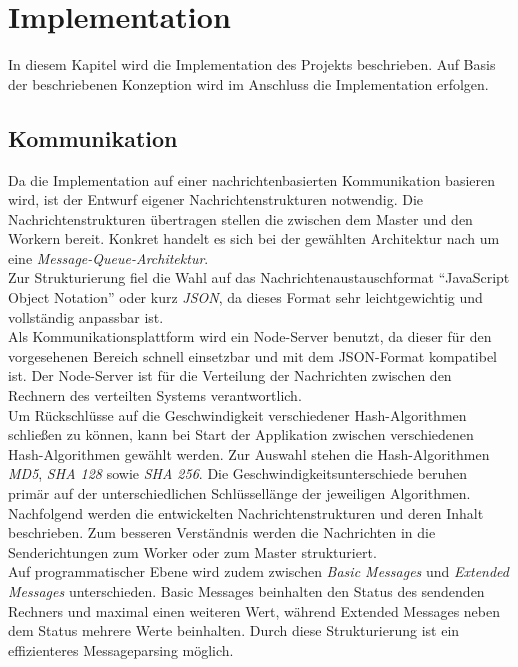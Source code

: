 \chapter{Implementation}
\label{implementation}
In diesem Kapitel wird die Implementation des Projekts beschrieben. Auf Basis der beschriebenen Konzeption wird im Anschluss die Implementation erfolgen. 
\section{Kommunikation}
Da die Implementation auf einer nachrichtenbasierten Kommunikation basieren wird, ist der Entwurf eigener Nachrichtenstrukturen notwendig. Die Nachrichtenstrukturen übertragen stellen die zwischen dem Master und den Workern bereit. Konkret handelt es sich bei der gewählten Architektur nach \citep{tanenbaum} um eine \emph{Message-Queue-Architektur}. \\
Zur Strukturierung fiel die Wahl auf das Nachrichtenaustauschformat \enquote{JavaScript Object Notation} oder kurz \emph{JSON}, da dieses Format sehr leichtgewichtig und vollständig anpassbar ist. \\
Als Kommunikationsplattform wird ein Node-Server benutzt, da dieser für den vorgesehenen Bereich schnell einsetzbar und mit dem JSON-Format kompatibel ist. Der Node-Server ist für die Verteilung der Nachrichten zwischen den Rechnern des verteilten Systems verantwortlich. \\

Um Rückschlüsse auf die Geschwindigkeit verschiedener Hash-Algorithmen schließen zu können, kann bei Start der Applikation zwischen verschiedenen Hash-Algorithmen gewählt werden. Zur Auswahl stehen die Hash-Algorithmen \emph{MD5}, \emph{SHA 128} sowie \emph{SHA 256}. Die Geschwindigkeitsunterschiede beruhen primär auf der unterschiedlichen Schlüssellänge der jeweiligen Algorithmen.\\


Nachfolgend werden die entwickelten Nachrichtenstrukturen und deren Inhalt beschrieben. Zum besseren Verständnis werden die Nachrichten in die Senderichtungen zum Worker oder zum Master strukturiert. \\
Auf programmatischer Ebene wird zudem zwischen \emph{Basic Messages} und \emph{Extended Messages} unterschieden. Basic Messages beinhalten den Status des sendenden Rechners und maximal einen weiteren Wert, während Extended Messages neben dem Status mehrere Werte beinhalten. Durch diese Strukturierung ist ein effizienteres Messageparsing möglich. 

